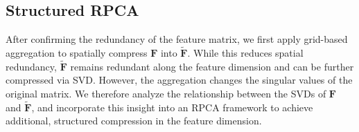 \documentclass[10pt,twocolumn,letterpaper]{article}
\begin{document}
\subsection{Structured RPCA}
After confirming the redundancy of the feature matrix, we first apply grid-based aggregation to spatially compress $\mathbf{F}$ into $\tilde{\mathbf{F}}$. While this reduces spatial redundancy, $\tilde{\mathbf{F}}$ remains redundant along the feature dimension and can be further compressed via SVD. However, the aggregation changes the singular values of the original matrix. We therefore analyze the relationship between the SVDs of $\mathbf{F}$ and $\tilde{\mathbf{F}}$, and incorporate this insight into an RPCA framework to achieve additional, structured compression in the feature dimension.
\end{document}

